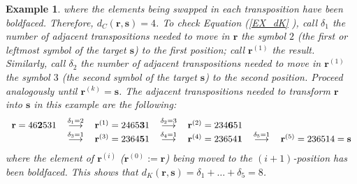 \documentclass{article}
\newtheorem{example}[theorem]{Example}
\begin{document}
\begin{example}
where the elements being swapped in each transposition have been boldfaced.
Therefore, $d_{C}(\mathbf{r},\mathbf{s})=4$. To check Equation (\ref{EX_dK}%
), call $\delta _{1}$ the number of adjacent transpositions needed to move
in $\mathbf{r}$ the symbol $2$ (the first or leftmost symbol of the target $%
\mathbf{s}$) to the first position; call $\mathbf{r}^{(1)}$ the result.
Similarly, call $\delta _{2}$ the number of adjacent transpositions needed
to move in $\mathbf{r}^{(1)}$ the symbol $3$ (the second symbol of the
target $\mathbf{s}$) to the second position. Proceed analogously until $%
\mathbf{r}^{(k)}=\mathbf{s}$. The adjacent transpositions needed to
transform $\mathbf{r}$ into $\mathbf{s}$ in this example are the following:
\begin{equation*}
\begin{tabular}{lllllll}
$\mathbf{r}=46\mathbf{2}531$ & $\overset{\delta _{1}=2}{\longrightarrow }$ & 
$\mathbf{r}^{(1)}=2465\mathbf{3}1$ & $\overset{\delta _{2}=3}{%
\longrightarrow }$ & $\mathbf{r}^{(2)}=234\mathbf{6}51$ &  &  \\ 
& $\overset{\delta _{3}=1}{\longrightarrow }$ & $\mathbf{r}^{(3)}=2364%
\mathbf{5}1$ & $\overset{\delta _{4}=1}{\longrightarrow }$ & $\mathbf{r}%
^{(4)}=23654\mathbf{1}$ & $\overset{\delta _{5}=1}{\longrightarrow }$ & $%
\mathbf{r}^{(5)}=236514=\mathbf{s}$%
\end{tabular}%
\end{equation*}%
where the element of $\mathbf{r}^{(i)}$ ($\mathbf{r}^{(0)}:=\mathbf{r}$)
being moved to the $(i+1)$-position has been boldfaced. This shows that $d_{K}(\mathbf{r},\mathbf{s})=\delta _{1}+\ldots+\delta _{5}=8$.
\end{example}
\end{document}
